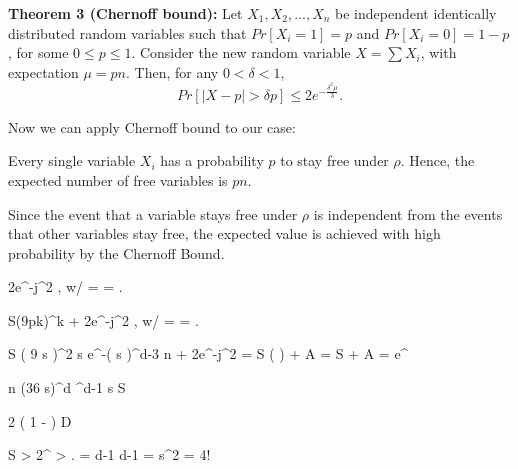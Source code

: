 \textbf{Theorem 3 (Chernoff bound):} Let \( X_1, X_2, ..., X_n \) be independent identically distributed random variables such that \( Pr[X_i = 1] = p \) and \( Pr[X_i = 0] = 1 - p \), for some \( 0 \leq p \leq 1 \).
Consider the new random variable \( X = \sum X_i \), with expectation \( \mu = pn \). Then, for any \( 0 < \delta < 1 \),
\[
Pr[|X - p| > \delta p] \leq 2 e^{- \frac{\delta^2 \mu}{3}}.
\]

Now we can apply Chernoff bound to our case:

Every single variable \( X_i \) has a probability \( p \) to stay free under \( \rho \).
Hence, the expected number of free variables is \( pn \).

Since the event that a variable stays free under \( \rho \) is independent from the events that other variables stay free, the expected value is achieved with high probability by the Chernoff Bound.




2e^{-j^2 \cdot {}}, \quad w/ \quad \delta =  \quad {} \quad \mu = .


\leq S(9pk)^k + 2e^{-j^2 \cdot {}}, \quad w/ \quad \delta =  \quad {} \quad \mu = .

S \left( 9 \cdot {}  \log s \right)^{2 \log s} \cdot e^{-\left(   \log s \right)^{d-3} \cdot n} + 2e^{-j^2 \cdot {}} = S \cdot \left(  \cdot {} \right) + A
= S \cdot {} + A =  \cdot e^{}


  \Rightarrow n \geq (36 \cdot \log s)^d ^{d-1} 
\Rightarrow {}  \log s \Rightarrow S \leq {}

2 \cdot \left( 1 -  \right) \leq D

 S > 2^{} > .   = d-1  d-1 = \log s^2 = 4! \quad \Box




